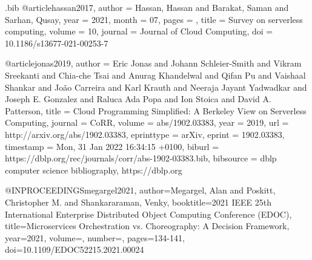 \begin{filecontents}{\jobname.bib}
@article{hassan2017,
author = {Hassan, Hassan and Barakat, Saman and Sarhan, Qusay},
year = {2021},
month = {07},
pages = {},
title = {Survey on serverless computing},
volume = {10},
journal = {Journal of Cloud Computing},
doi = {10.1186/s13677-021-00253-7}
}

@article{jonas2019,
  author    = {Eric Jonas and
               Johann Schleier{-}Smith and
               Vikram Sreekanti and
               Chia{-}che Tsai and
               Anurag Khandelwal and
               Qifan Pu and
               Vaishaal Shankar and
               Jo{\~{a}}o Carreira and
               Karl Krauth and
               Neeraja Jayant Yadwadkar and
               Joseph E. Gonzalez and
               Raluca Ada Popa and
               Ion Stoica and
               David A. Patterson},
  title     = {Cloud Programming Simplified: {A} Berkeley View on Serverless Computing},
  journal   = {CoRR},
  volume    = {abs/1902.03383},
  year      = {2019},
  url       = {http://arxiv.org/abs/1902.03383},
  eprinttype = {arXiv},
  eprint    = {1902.03383},
  timestamp = {Mon, 31 Jan 2022 16:34:15 +0100},
  biburl    = {https://dblp.org/rec/journals/corr/abs-1902-03383.bib},
  bibsource = {dblp computer science bibliography, https://dblp.org}
}

@INPROCEEDINGS{megargel2021,  author={Megargel, Alan and Poskitt, Christopher M. and Shankararaman, Venky},  booktitle={2021 IEEE 25th International Enterprise Distributed Object Computing Conference (EDOC)},   title={Microservices Orchestration vs. Choreography: A Decision Framework},   year={2021},  volume={},  number={},  pages={134-141},  doi={10.1109/EDOC52215.2021.00024}}
\end{filecontents}
\documentclass[a4paper,12pt]{report}
\usepackage[a4paper,inner = 0.5cm, outer = 0.5cm, top = 2cm, bottom = 2cm]{geometry}

\usepackage[english,romanian]{babel}
\usepackage{blindtext}
\usepackage{fancyhdr}
\usepackage{wrapfig}
\usepackage{graphicx}
\usepackage{amsmath}
\usepackage{caption}
\usepackage{dirtytalk}
\usepackage{url}
\usepackage{listings}
\lstset{
basicstyle=\small\ttfamily,
columns=flexible,
breaklines=true
}
\usepackage{fancyvrb}

\renewenvironment{abstract}[1]
  {\bigskip\selectlanguage{#1}%
   \begin{center}\bfseries\abstractname\end{center}}
  {\par\bigskip}

\newcommand{\source}[1]{\caption*{Sursă: {#1}} }

